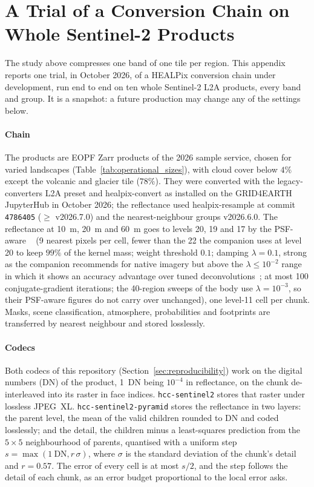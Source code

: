 \section{A Trial of a Conversion Chain on Whole Sentinel-2 Products}
\label{app:large_scale_trial}
The study above compresses one band of one tile per region. This
appendix reports one trial, in October 2026, of a HEALPix conversion
chain under development, run end to end on ten whole Sentinel-2 L2A
products, every band and group. It is a snapshot: a future production
may change any of the settings below.

\paragraph{Chain}
The products are EOPF Zarr products of the 2026 sample service, chosen
for varied landscapes (Table~\ref{tab:operational_sizes}), with cloud
cover below $4\%$ except the volcanic and glacier tile ($78\%$). They
were converted with the legacy-converters L2A preset and healpix-convert
as installed on the GRID4EARTH JupyterHub in October 2026; the
reflectance used healpix-resample at commit \texttt{4786405}
($\ge$ v2026.7.0) and the nearest-neighbour groups v2026.6.0. The
reflectance at \SI{10}{m}, \SI{20}{m} and \SI{60}{m} goes to levels 20,
19 and 17 by the PSF-aware ~\cite{delouis2026resample}
(9 nearest pixels per cell, fewer than the 22 the companion uses at
level 20 to keep $99\%$ of the kernel mass; weight threshold $0.1$;
damping $\lambda=0.1$, strong as the companion recommends for native
imagery but above the $\lambda\le10^{-2}$ range in which it shows an
accuracy advantage over tuned deconvolutions~\cite{delouis2026resample};
at most 100 conjugate-gradient iterations; the 40-region sweeps of the
body use $\lambda=10^{-3}$, so their PSF-aware figures do not carry over
unchanged), one level-11 cell per chunk. Masks, scene
classification, atmosphere, probabilities and footprints are transferred
by nearest neighbour and stored losslessly.

\paragraph{Codecs}
Both codecs of this repository (Section~\ref{sec:reproducibility}) work
on the digital numbers (DN) of the product, 1~DN being $10^{-4}$ in
reflectance, on the chunk de-interleaved into its raster in face
indices. \texttt{hcc-sentinel2} stores that raster under lossless
JPEG~XL. \texttt{hcc-sentinel2-pyramid} stores the reflectance in two
layers: the parent level, the mean of the valid children rounded to DN
and coded losslessly; and the detail, the children minus a least-squares
prediction from the $5\times5$ neighbourhood of parents, quantised with
a uniform step $s=\max(1~\mathrm{DN}, r\,\sigma)$, where $\sigma$ is the
standard deviation of the chunk's detail and $r=0.57$. The error of
every cell is at most $s/2$, and the step follows the detail of each
chunk, as an error budget proportional to the local 
error asks.

